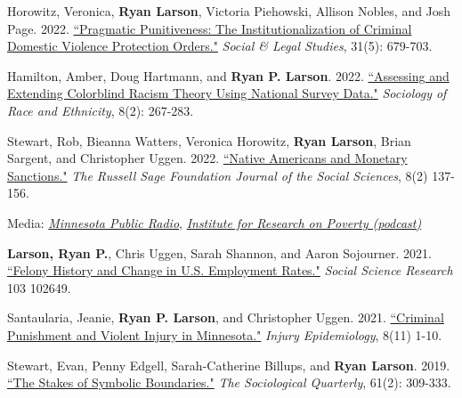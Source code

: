 \documentclass[letterpaper]{article}
\renewenvironment{itemize}{
  \begin{list}{}{
    \setlength{\leftmargin}{1.5em}
  }
}{
  \end{list}
}
\begin{document}
\begin{itemize}
\item Horowitz, Veronica,  \textbf{Ryan Larson}, Victoria Piehowski, Allison Nobles, and Josh Page. 2022. \href{https://ryanplarson.github.io/personal_site/pubs/horowitz_etal_21.pdf}{``Pragmatic Punitiveness: The Institutionalization of Criminal Domestic Violence Protection Orders."} \textit{Social \& Legal Studies}, 31(5): 679-703.

\item Hamilton, Amber, Doug Hartmann, and \textbf{Ryan P. Larson}. 2022. \href{https://ryanplarson.github.io/personal_site/pubs/hamilton_etal_22.pdf}{``Assessing and Extending Colorblind Racism Theory Using National Survey Data."} \textit{Sociology of Race and Ethnicity}, 8(2): 267-283.

\item Stewart, Rob, Bieanna Watters, Veronica Horowitz, \textbf{Ryan Larson}, Brian Sargent, and Christopher Uggen. 2022. \href{https://ryanplarson.github.io/personal_site/pubs/stewart_etal_22.pdf}{``Native Americans and Monetary Sanctions."} \textit{The Russell Sage Foundation Journal of the Social Sciences}, 8(2) 137-156.

\begin{itemize}
\item Media: \href{https://www.mprnews.org/story/2022/04/21/native-women-incarcerated}{\textit{Minnesota Public Radio}}, \href{https://www.irp.wisc.edu/resource/brieanna-watters-and-robert-stewart-on-native-americans-and-monetary-sanctions/}{\textit{Institute for Research on Poverty (podcast)}}
\end{itemize}

\item  \textbf{Larson, Ryan P.}, Chris Uggen, Sarah Shannon, and Aaron Sojourner. 2021. \href{https://ryanplarson.github.io/personal_site/pubs/larson_etal_22.pdf}{``Felony History and Change in U.S. Employment Rates."} \textit{Social Science Research} 103 102649.

\item  Santaularia, Jeanie, \textbf{Ryan P. Larson}, and Christopher Uggen. 2021. \href{https://ryanplarson.github.io/personal_site/pubs/santaularia_etal_21.pdf}{``Criminal Punishment and Violent Injury in Minnesota."} \textit{Injury Epidemiology}, 8(11) 1-10.

\item Stewart, Evan, Penny Edgell, Sarah-Catherine Billups, and \textbf{Ryan Larson}. 2019. \href{https://ryanplarson.github.io/personal_site/pubs/stewart_etal_19.pdf}{``The Stakes of Symbolic Boundaries."} \textit{The Sociological Quarterly}, 61(2): 309-333.


\end{itemize}
\end{document}
